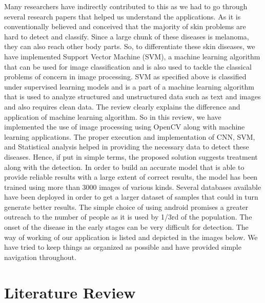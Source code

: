 \documentclass{article}
\begin{document}
Many researchers have indirectly contributed to this as we had to go through several research papers that helped us understand the applications.
As it is conventionally believed and conceived that the majority of skin problems are hard to detect and classify. Since a large chunk of these diseases is melanoma, they can also reach other body parts.
So, to differentiate these skin diseases, we have implemented Support Vector Machine (SVM), a machine learning algorithm that can be used for image classification and is also used to tackle the classical problems of concern in image processing.
SVM as specified above is classified under supervised learning models and is a part of a machine learning algorithm that is used to analyze structured and unstructured data such as text and images and also requires clean data.
The review clearly explains the difference and application of machine learning algorithm.
So in this review, we have implemented the use of image processing using OpenCV along with machine learning applications.
The proper execution and implementation of CNN, SVM, and Statistical analysis helped in providing the necessary data to detect these diseases.
Hence, if put in simple terms, the proposed solution suggests treatment along with the detection.
In order to build an accurate model that is able to provide reliable results with a large extent of correct results, the model has been trained using more than 3000 images of various kinds. Several databases available have been deployed in order to get a larger dataset of samples that could in turn generate better results.
The simple choice of using android promises a greater outreach to the number of people as it is used by 1/3rd of the population.
The onset of the disease in the early stages can be very difficult for detection. The way of working of our application is listed and depicted in the images below.
We have tried to keep things as organized as possible and have provided simple navigation throughout.

\section{Literature Review}
\end{document}
